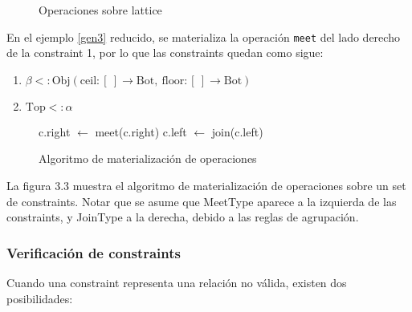 \begin{figure}[ht]
  \centering
  \label{latticexy}
  \caption{Operaciones sobre lattice}
\end{figure}

En el ejemplo \ref{gen3} reducido, se materializa la operación \texttt{meet} del lado derecho de la constraint 1, por lo que las constraints quedan como sigue:

\begin{enumerate}
  \item $\beta <: \text{Obj}(\text{ceil}: [\ ] \rightarrow \text{Bot},\ \text{floor}: [\ ] \rightarrow \text{Bot})$
  \item $\text{Top} <: \alpha$
\end{enumerate}

\begin{figure}[ht]
  \centering
  \label{pseudoperations}
  \begin{mdframed}
    \begin{algorithmic}
              \State c.right $\gets$ meet(c.right)
            \EndIf
              \State c.left $\gets$ join(c.left)
            \EndIf
          \EndFor
      \EndFunction
    \end{algorithmic}
  \end{mdframed}
  \caption{Algoritmo de materialización de operaciones}
\end{figure}

La figura 3.3 muestra el algoritmo de materialización de operaciones sobre un set de constraints. Notar que se asume que MeetType aparece a la izquierda de las constraints, y JoinType a la derecha, debido a las reglas de agrupación.


\subsubsection{Verificación de constraints}
Cuando una constraint representa una relación no válida, existen dos posibilidades:

